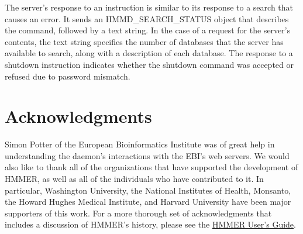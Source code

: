 \documentclass[notoc,justified,openany]{tufte-book}    %
\begin{document}
The server's response to an instruction is similar to its response to a search that causes an error.  It sends an {HMMD\_SEARCH\_STATUS} object that describes the command, followed by a text string.  In the case of a request for the server's contents, the text string specifies the number of databases that the server has available to search, along with a description of each database.  The response to a shutdown instruction indicates whether the shutdown command was accepted or refused due to password mismatch.


\chapter{Acknowledgments}
Simon Potter of the European Bioinformatics Institute was of great help in understanding the daemon's interactions with the EBI's web servers.  We would also like to thank all of the organizations that have supported the development of HMMER, as well as all of the individuals who have contributed to it. In particular, Washington University, the National Institutes of Health, Monsanto, the Howard Hughes Medical Institute, and Harvard University have been major supporters of this work.  For a more thorough set of acknowledgments that includes a discussion of HMMER's history, please see the \underline{HMMER User's Guide}.

\label{manualend}

% 
\end{document}
